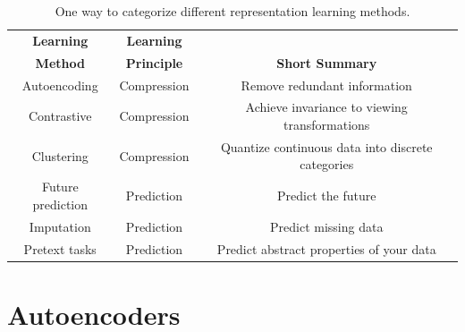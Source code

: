 \begin{table}[]
    \caption{One way to categorize different representation learning methods.} %
    \begin{center}
        \begin{tabular}{ccc}
            \toprule
            \textbf{Learning} & \textbf{Learning}  &                                                   \\
            \textbf{Method}   & \textbf{Principle} & \textbf{Short Summary}                            \\
            \midrule
            Autoencoding      & Compression        & Remove redundant information                      \\
            Contrastive       & Compression        & Achieve invariance to viewing transformations     \\
            Clustering        & Compression        & Quantize continuous data into discrete categories \\
            Future prediction & Prediction         & Predict the future                                \\
            Imputation        & Prediction         & Predict missing data                              \\
            Pretext tasks     & Prediction         & Predict abstract properties of your data          \\
            \bottomrule
        \end{tabular}
    \end{center}
    \label{tab:representation_learning:types_of_representation_learners}
\end{table}


\section{Autoencoders}\label{sec:representation_learning:autoencoders}


